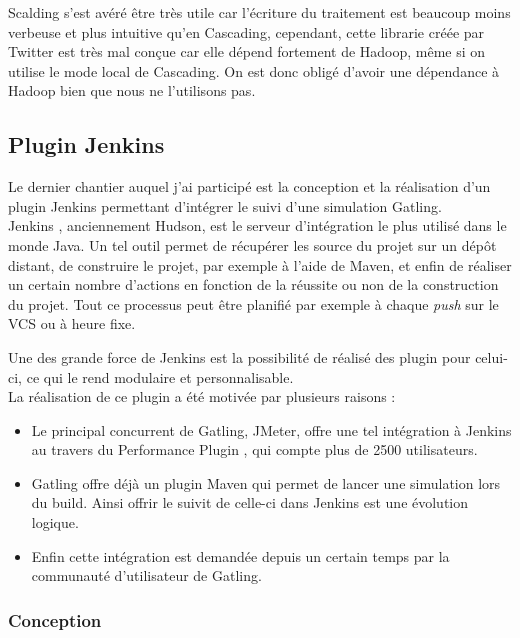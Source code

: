 Scalding s'est avéré être très utile car l'écriture du traitement est beaucoup moins verbeuse et plus intuitive qu'en Cascading, cependant, cette librarie créée par Twitter est très mal conçue car elle dépend fortement de Hadoop, même si on utilise le mode local de Cascading. On est donc obligé d'avoir une dépendance à Hadoop bien que nous ne l'utilisons pas.

\subsection{Plugin Jenkins}

Le dernier chantier auquel j'ai participé est la conception et la réalisation d'un plugin Jenkins permettant d'intégrer le suivi d'une simulation Gatling.\\

Jenkins \cite{jenkins}, anciennement Hudson, est le serveur d'intégration le plus utilisé dans le monde Java. Un tel outil permet de récupérer les source du projet sur un dépôt distant, de construire le projet, par exemple à l'aide de Maven, et enfin de réaliser un certain nombre d'actions en fonction de la réussite ou non de la construction du projet. Tout ce processus peut être planifié par exemple à chaque \textit{push} sur le VCS ou à heure fixe.

Une des grande force de Jenkins est la possibilité de réalisé des plugin pour celui-ci, ce qui le rend modulaire et personnalisable.\\ 

La réalisation de ce plugin a été motivée par plusieurs raisons :

\begin{itemize}
	\item Le principal concurrent de Gatling, JMeter, offre une tel intégration à Jenkins au travers du Performance Plugin \cite{perfplugin}, qui compte plus de 2500 utilisateurs.
	\item Gatling offre déjà un plugin Maven qui permet de lancer une simulation lors du build. Ainsi offrir le suivit de celle-ci dans Jenkins est une évolution logique.
	\item Enfin cette intégration est demandée depuis un certain temps par la communauté d'utilisateur de Gatling.
\end{itemize}

\subsubsection{Conception}

